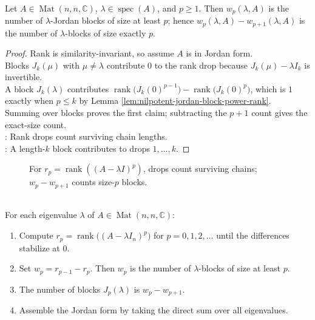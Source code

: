 \begin{theorem} \label{thm:jordan-block-sizes-from-rank-drops} \\
Let $A\in\operatorname{Mat}(n,n,\mathbb{C})$, $\lambda\in\operatorname{spec}(A)$, and $p\geq1$. Then $w_p(\lambda,A)$ is the number of $\lambda$-Jordan blocks of size at least $p$; hence $w_p(\lambda,A)-w_{p+1}(\lambda,A)$ is the number of $\lambda$-blocks of size exactly $p$.
\begin{proof}
Rank is similarity-invariant, so assume $A$ is in Jordan form.\\
Blocks $J_k(\mu)$ with $\mu\neq\lambda$ contribute $0$ to the rank drop because $J_k(\mu)-\lambda I_k$ is invertible.\\
A block $J_k(\lambda)$ contributes $\operatorname{rank}\bigl(J_k(0)^{p-1}\bigr)-\operatorname{rank}\bigl(J_k(0)^p\bigr)$, which is $1$ exactly when $p\leq k$ by Lemma \ref{lem:nilpotent-jordan-block-power-rank}.\\
Summing over blocks proves the first claim; subtracting the $p+1$ count gives the exact-size count.\\
: Rank drops count surviving chain lengths.\\
: A length-$k$ block contributes to drops $1,\ldots,k$.
\end{proof}
\end{theorem}

\begin{figure}[H]
  \centering
  
  \caption{For $r_p=\operatorname{rank}((A-\lambda I)^p)$, drops count surviving chains; $w_p-w_{p+1}$ counts size-$p$ blocks.}
  \label{fig:weyr-rank-drops-jordan-blocks}
\end{figure}

\begin{method} \label{meth:jordan-form-from-rank-drops} \\
For each eigenvalue $\lambda$ of $A\in\operatorname{Mat}(n,n,\mathbb{C})$:
\begin{enumerate}[label=(\roman*)]
\setlength{\itemsep}{0pt}
\item Compute $r_p=\operatorname{rank}\bigl((A-\lambda I_n)^p\bigr)$ for $p=0,1,2,\ldots$ until the differences stabilize at $0$.
\item Set $w_p=r_{p-1}-r_p$. Then $w_p$ is the number of $\lambda$-blocks of size at least $p$.
\item The number of blocks $J_p(\lambda)$ is $w_p-w_{p+1}$.
\item Assemble the Jordan form by taking the direct sum over all eigenvalues.
\end{enumerate}
\end{method}

